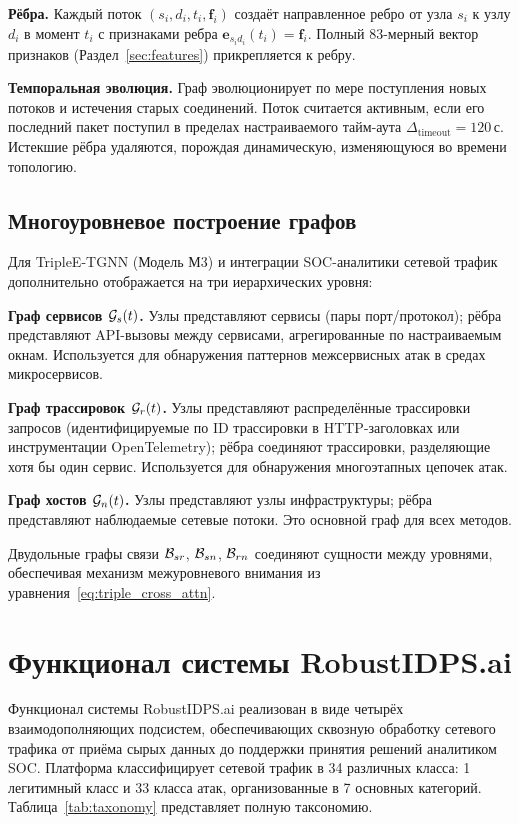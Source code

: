 \noindent\textbf{Рёбра.} Каждый поток $(s_i, d_i, t_i, \mathbf{f}_i)$ создаёт направленное ребро от узла $s_i$ к узлу $d_i$ в момент $t_i$ с признаками ребра $\mathbf{e}_{s_id_i}(t_i) = \mathbf{f}_i$. Полный 83-мерный вектор признаков (Раздел~\ref{sec:features}) прикрепляется к ребру.

\noindent\textbf{Темпоральная эволюция.} Граф эволюционирует по мере поступления новых потоков и истечения старых соединений. Поток считается активным, если его последний пакет поступил в пределах настраиваемого тайм-аута $\Delta_{\mathrm{timeout}}=120$\,с. Истекшие рёбра удаляются, порождая динамическую, изменяющуюся во времени топологию.

\subsection{Многоуровневое построение графов}

Для TripleE-TGNN (Модель М3) и интеграции SOC-аналитики сетевой трафик дополнительно отображается на три иерархических уровня:

\noindent\textbf{Граф сервисов $\mathcal{G}_s(t)$.} Узлы представляют сервисы (пары порт/протокол); рёбра представляют API-вызовы между сервисами, агрегированные по настраиваемым окнам. Используется для обнаружения паттернов межсервисных атак в средах микросервисов.

\noindent\textbf{Граф трассировок $\mathcal{G}_r(t)$.} Узлы представляют распределённые трассировки запросов (идентифицируемые по ID трассировки в HTTP-заголовках или инструментации OpenTelemetry); рёбра соединяют трассировки, разделяющие хотя бы один сервис. Используется для обнаружения многоэтапных цепочек атак.

\noindent\textbf{Граф хостов $\mathcal{G}_n(t)$.} Узлы представляют узлы инфраструктуры; рёбра представляют наблюдаемые сетевые потоки. Это основной граф для всех методов.

\noindent Двудольные графы связи $\mathcal{B}_{sr}$, $\mathcal{B}_{sn}$, $\mathcal{B}_{rn}$ соединяют сущности между уровнями, обеспечивая механизм межуровневого внимания из уравнения~\eqref{eq:triple_cross_attn}.

\section{Функционал системы RobustIDPS.ai}
\label{sec:taxonomy}

Функционал системы RobustIDPS.ai реализован в виде четырёх взаимодополняющих подсистем, обеспечивающих сквозную обработку сетевого трафика от приёма сырых данных до поддержки принятия решений аналитиком SOC. Платформа классифицирует сетевой трафик в 34 различных класса: 1 легитимный класс и 33 класса атак, организованные в 7 основных категорий. Таблица~\ref{tab:taxonomy} представляет полную таксономию.

